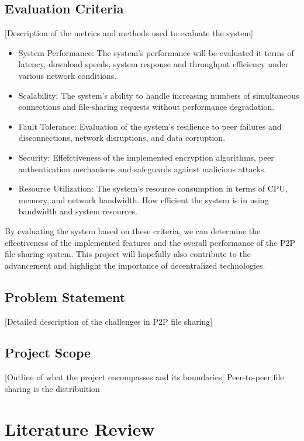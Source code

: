 \documentclass[12pt,a4paper]{report}
\begin{document}
\section{Evaluation Criteria}
 [Description of the metrics and methods used to evaluate the system]

\begin{itemize}
	\item System Performance: The system's performance will be evaluated it terms of latency, download speeds, system response and throughput efficiency under various network conditions.
	\item Scalability: The system's ability to handle increasing numbers of simultaneous connections and file-sharing requests without performance degradation.
	\item Fault Tolerance: Evaluation of the system's resilience to peer failures and disconnections, network disruptions, and data corruption.
	\item Security: Effefctiveness of the implemented encryption algorithms, peer authentication mechanisms and safeguards against malicious attacks.
	\item Resource Utilization: The system's resource consumption in terms of CPU, memory, and network bandwidth. How efficient the system is in using bandwidth and system resources.
\end{itemize}

By evaluating the system based on these criteria, we can determine the effectiveness of the implemented features and the overall performance of the P2P file-sharing system.
This project will hopefully also contribute to the advancement and highlight the importance of decentralized technologies.

\section{Problem Statement}
 [Detailed description of the challenges in P2P file sharing]

\section{Project Scope}
 [Outline of what the project encompasses and its boundaries]
Peer-to-peer file sharing is the distribuition

\chapter{Literature Review}
\end{document}
